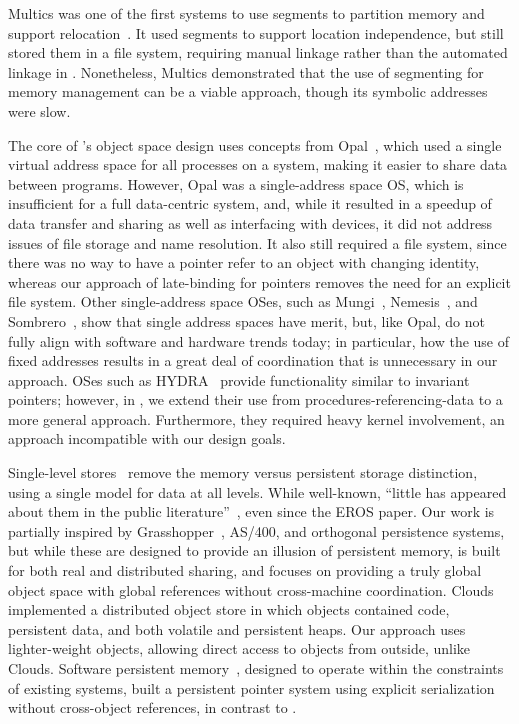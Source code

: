 Multics was one of the first systems to use segments to partition memory and
support relocation~\cite{bensoussan:sosp69,daley:cacm68}. It used segments to
support location independence, but still stored them in a file system, requiring manual linkage
rather than the automated linkage in \Twizzler. Nonetheless, Multics demonstrated that the use of
segmenting for memory management can be a viable approach, though its
symbolic addresses were slow.

The core of \Twizzler's object space design uses concepts
from Opal~\cite{chase:tocs94}, which used a single virtual
address space for all processes on a system, making it easier to share
data between programs. However, Opal was a single-address space OS, which is insufficient for
a full data-centric system,
and, while it resulted in a speedup of data transfer and sharing as well as interfacing with
devices, it did not address issues of file storage and name resolution. It also
still required a file
system, since there was no way to have a pointer refer to an object with changing identity,
whereas our approach
of late-binding for pointers
removes the need for an explicit file system.  Other single-address space
OSes, such as Mungi~\cite{heiser:scse9314},
Nemesis~\cite{roscoe:osr94}, and Sombrero~\cite{skousen:ipccc99}, show that
single address spaces have merit, but, like Opal, do not fully align with software and hardware trends today; in particular, how the use of fixed addresses
results in a great deal of coordination that is unnecessary in our approach.
OSes such as HYDRA~\cite{wulf:cacm74} provide functionality similar to invariant pointers;
however, in \Twizzler, we extend their use from procedures-referencing-data to
a more general approach. Furthermore, they required
heavy kernel involvement, an approach incompatible with
our design goals.

Single-level stores~\cite{shapiro:usenix02,shekita:uwtr956,dearle:cs94} remove the
memory versus persistent storage distinction, using a single model for data
at all levels. While well-known,
``little has appeared about them in the public
literature''~\cite{shapiro:usenix02}, even since the EROS paper.
Our work is partially inspired by Grasshopper~\cite{dearle:cs94}, AS/400, and orthogonal persistence systems,
but while these are designed to provide an illusion of persistent
memory, \Twizzler is built for both real \NVM and distributed sharing, and focuses on providing a truly global object space with
global references without cross-machine coordination.
Clouds~\cite{dasgupta:computer91} implemented a distributed object store in
which objects contained code, persistent data, and both volatile and
persistent heaps. Our approach uses lighter-weight objects, allowing direct
access to objects from outside, unlike Clouds. Software persistent
memory~\cite{guerra:atc12}, designed to operate within the constraints
of existing systems, built a persistent pointer system using explicit
serialization without cross-object references, in contrast to \Twizzler.

